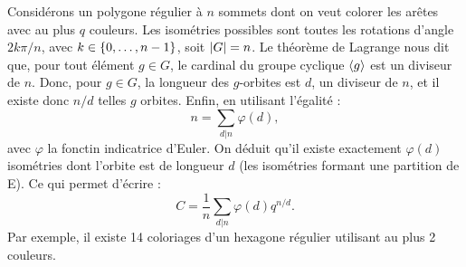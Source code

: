 \begin{appl}
Considérons un polygone régulier à $n$ sommets dont on veut colorer les arêtes avec au plus $q$ couleurs.
Les isométries possibles sont toutes les rotations d'angle $2k\pi/n$, avec $k \in \{ 0, \dots, n-1 \}$, soit $\lvert G\rvert = n$.
Le théorème de Lagrange nous dit que, pour tout élément $g \in G$, le cardinal du groupe cyclique $\langle g\rangle$ est un diviseur de $n$.
Donc, pour $g \in G$, la longueur des $g$-orbites est $d$, un diviseur de $n$, et il existe donc $n/d$ telles $g$ orbites.
Enfin, en utilisant l'égalité :
\[ n = \sum_{d | n} \varphi(d) , \]
avec $\varphi$ la fonctin indicatrice d'Euler.
On déduit qu'il existe exactement $\varphi(d)$ isométries dont l'orbite est de longueur $d$ (les isométries formant une partition de E).
Ce qui permet d'écrire :
\[ C = \dfrac1{n} \sum_{d | n} \varphi(d) q^{n/d} . \]
Par exemple, il existe 14 coloriages d'un hexagone régulier utilisant au plus 2 couleurs.
\end{appl}

